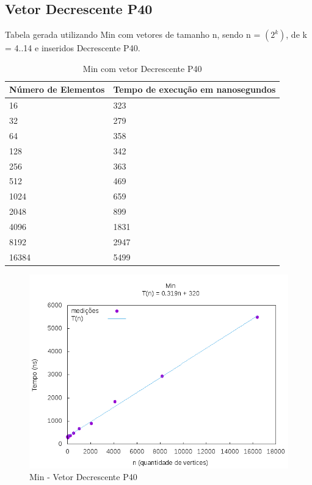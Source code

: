 \documentclass[12pt,a4paper,twoside]{report}
\begin{document}
\subsection{Vetor Decrescente P40}
Tabela gerada utilizando Min com vetores de tamanho n, sendo n = $(2^k)$, de k = 4..14 e inseridos Decrescente P40.
\begin{table}[H]
\centering
\caption{Min com vetor Decrescente P40}
\label{my-label}
\begin{tabular}{|l|l|}
\hline
\multicolumn{1}{|c|}{\textbf{Número de Elementos}} & \multicolumn{1}{c|}{\textbf{Tempo de execução em nanosegundos}} \\ \hline
16 & 323 \\ \hline
32 & 279 \\ \hline
64 & 358 \\ \hline
128 & 342 \\ \hline
256 & 363 \\ \hline
512 & 469 \\ \hline
1024 & 659 \\ \hline
2048 & 899 \\ \hline
4096 & 1831 \\ \hline
8192 & 2947 \\ \hline
16384 & 5499 \\ \hline

\end{tabular}
\end{table}

\begin{figure}[H]
    \centering
    \includegraphics[width=0.7\linewidth]{graficos/Min/Decrescente P40/Min.png}
  \caption{Min - Vetor Decrescente P40}
\end{figure}
\end{document}
